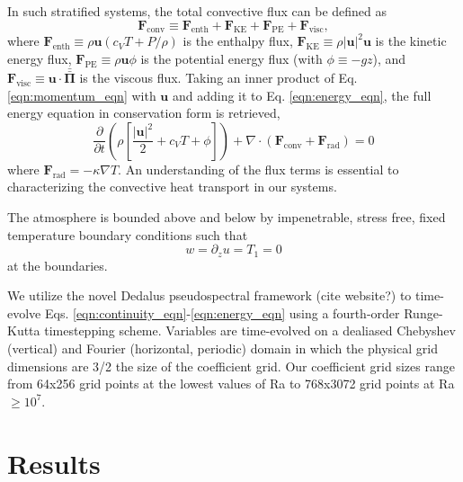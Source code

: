 \documentclass[aps, prl, twocolumn, groupedaddress, amsfonts, amssymb, amsmath]{revtex4-1}
\newcommand{\Div}[1]{\ensuremath{\nabla\cdot\left( #1\right)}}
\newcommand{\grad}{\ensuremath{\nabla}}
\newcommand{\stressT}{\ensuremath{\bm{\bar{\bar{\Pi}}}}}
\begin{document}
In such stratified systems, the total convective flux can be defined as
\begin{equation}
\bm{F}_{\text{conv}} \equiv \bm{F}_{\text{enth}} + \bm{F}_{\text{KE}} + \bm{F}_{\text{PE}} + \bm{F}_{\text{visc}},
\end{equation}
where $\bm{F}_{\text{enth}} \equiv \rho\bm{u}(c_V T + P/\rho)$ is the enthalpy flux, $\bm{F}_{\text{KE}} \equiv 
\rho|\bm{u}|^2\bm{u}$ is the kinetic energy flux, $\bm{F}_{\text{PE}} \equiv \rho\bm{u}\phi$ is the potential
energy flux (with $\phi \equiv -gz$), 
and $\bm{F}_{\text{visc}} \equiv \bm{u}\cdot\stressT$ is the viscous flux.  Taking an inner product of
Eq. \ref{eqn:momentum_eqn} with $\bm{u}$ and adding it to 
Eq. \ref{eqn:energy_eqn}, the full energy equation in conservation form is retrieved,
\begin{equation}
\frac{\partial}{\partial t}\left(\rho\left[\frac{|\bm{u}|^2}{2} + c_V T + \phi\right]\right) +
\Div{\bm{F}_{\text{conv}} + \bm{F}_{\text{rad}}} = 0
	\label{eqn:energy_eqn_full}
\end{equation}
where $\bm{F}_{\text{rad}} = -\kappa \grad T$.  An understanding of the flux terms is essential to characterizing
the convective heat transport in our systems.

The atmosphere is bounded above
and below by impenetrable, stress free, fixed temperature boundary conditions such that
\begin{equation}
w = \partial_z u = T_1 = 0
\end{equation}
at the boundaries. 


We utilize the novel Dedalus pseudospectral framework (cite website?) to time-evolve Eqs. 
\ref{eqn:continuity_eqn}-\ref{eqn:energy_eqn} using a fourth-order Runge-Kutta timestepping scheme.  
Variables are time-evolved on a dealiased Chebyshev (vertical)
and Fourier (horizontal, periodic) domain in which the
physical grid dimensions are 3/2 the size of the coefficient grid.  Our coefficient grid sizes range from
64x256 grid points at the lowest values of Ra to 768x3072 grid points at Ra $\geq 10^{7}$.  

\section{Results}
\label{sec:results}
\end{document}
